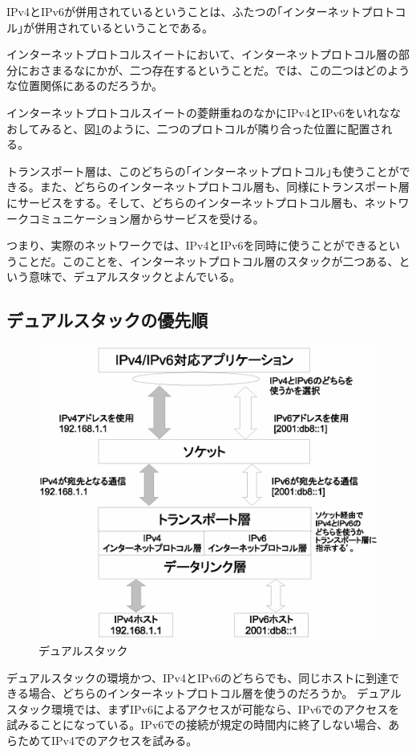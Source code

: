 IPv4とIPv6が併用されているということは、ふたつの｢インターネットプロトコル｣が併用されているということである。

インターネットプロトコルスイートにおいて、インターネットプロトコル層の部分におさまるなにかが、二つ存在するということだ。では、この二つはどのような位置関係にあるのだろうか。

インターネットプロトコルスイートの菱餅重ねのなかにIPv4とIPv6をいれななおしてみると、図\ref{fig:dualstack}のように、二つのプロトコルが隣り合った位置に配置される。

トランスポート層は、このどちらの｢インターネットプロトコル｣も使うことができる。また、どちらのインターネットプロトコル層も、同様にトランスポート層にサービスをする。そして、どちらのインターネットプロトコル層も、ネットワークコミュニケーション層からサービスを受ける。

つまり、実際のネットワークでは、IPv4とIPv6を同時に使うことができるということだ。このことを、インターネットプロトコル層のスタックが二つある、という意味で、デュアルスタックとよんでいる。

\subsection{デュアルスタックの優先順}

\begin{figure}[htbp]
	\includegraphics[width=12cm,clip]{draw/doublebind.eps}
	\caption{デュアルスタック}
	\label{fig:dualstack}
\end{figure}

デュアルスタックの環境かつ、IPv4とIPv6のどちらでも、同じホストに到達できる場合、どちらのインターネットプロトコル層を使うのだろうか。
デュアルスタック環境では、まずIPv6によるアクセスが可能なら、IPv6でのアクセスを試みることになっている。IPv6での接続が規定の時間内に終了しない場合、あらためてIPv4でのアクセスを試みる。

